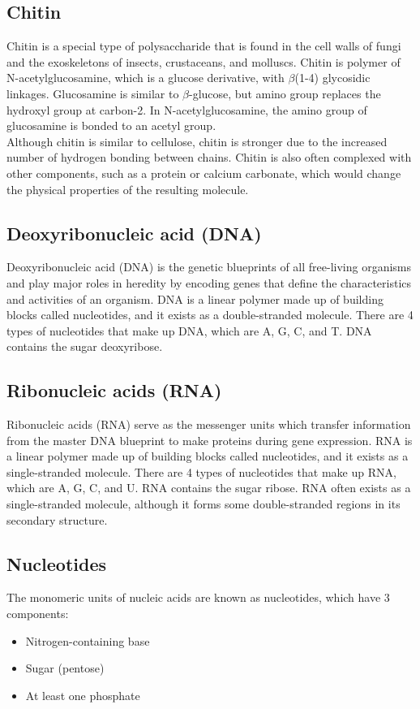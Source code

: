 \documentclass[11pt]{article}
\begin{document}
\subsection{Chitin}
\label{sec:org9f323a6}
Chitin is a special type of polysaccharide that is found in the cell walls of fungi and the exoskeletons of insects, crustaceans, and molluscs. Chitin is polymer of N-acetylglucosamine, which is a glucose derivative, with \(\beta\)(1-4) glycosidic linkages. Glucosamine is similar to \(\beta\)-glucose, but amino group replaces the hydroxyl group at carbon-2. In N-acetylglucosamine, the amino group of glucosamine is bonded to an acetyl group.
\\[0pt]

Although chitin is similar to cellulose, chitin is stronger due to the increased number of hydrogen bonding between chains. Chitin is also often complexed with other components, such as a protein or calcium carbonate, which would change the physical properties of the resulting molecule.

\subsection{Deoxyribonucleic acid (DNA)}
\label{sec:orgc349e62}
Deoxyribonucleic acid (DNA) is the genetic blueprints of all free-living organisms and play major roles in heredity by encoding genes that define the characteristics and activities of an organism. DNA is a linear polymer made up of building blocks called nucleotides, and it exists as a double-stranded molecule. There are 4 types of nucleotides that make up DNA, which are A, G, C, and T. DNA contains the sugar deoxyribose.

\subsection{Ribonucleic acids (RNA)}
\label{sec:orgb9ba8d9}
Ribonucleic acids (RNA) serve as the messenger units which transfer information from the master DNA blueprint to make proteins during gene expression. RNA is a linear polymer made up of building blocks called nucleotides, and it exists as a single-stranded molecule. There are 4 types of nucleotides that make up RNA, which are A, G, C, and U. RNA contains the sugar ribose. RNA often exists as a single-stranded molecule, although it forms some double-stranded regions in its secondary structure.

\subsection{Nucleotides}
\label{sec:org5fac507}
The monomeric units of nucleic acids are known as nucleotides, which have 3 components:
\begin{itemize}
\item Nitrogen-containing base
\item Sugar (pentose)
\item At least one phosphate
\end{itemize}
\end{document}
